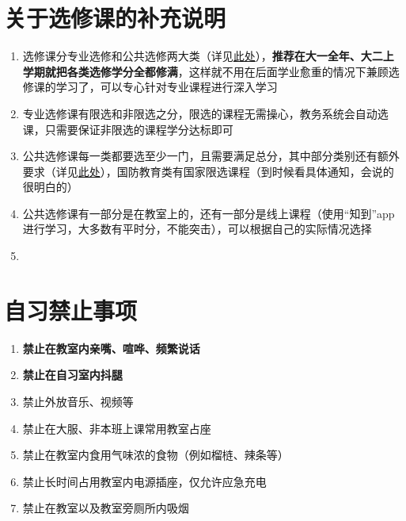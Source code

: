 \section[关于选修课的补充说明]{关于选修课的补充说明}
\begin{enumerate}
    \item 选修课分专业选修和公共选修两大类（详见\hyperref[score]{此处}），\textbf{推荐在大一全年、大二上学期就把各类选修学分全都修满}，这样就不用在后面学业愈重的情况下兼顾选修课的学习了，可以专心针对专业课程进行深入学习
    \item 专业选修课有限选和非限选之分，限选的课程无需操心，教务系统会自动选课，只需要保证非限选的课程学分达标即可
    \item 公共选修课每一类都要选至少一门，且需要满足总分，其中部分类别还有额外要求（详见\hyperref[score]{此处}），国防教育类有国家限选课程（到时候看具体通知，会说的很明白的）
    \item 公共选修课有一部分是在教室上的，还有一部分是线上课程（使用“知到”app进行学习，大多数有平时分，不能突击），可以根据自己的实际情况选择\footnotemark
    \item \textbf{}
\end{enumerate}

\section[自习禁止事项]{自习禁止事项}
\begin{enumerate}
    \item \textbf{禁止在教室内亲嘴、喧哗、频繁说话}
    \item \textbf{禁止在自习室内抖腿}
    \item 禁止外放音乐、视频等
    \item 禁止在大服、非本班上课常用教室占座
    \item 禁止在教室内食用气味浓的食物（例如榴梿、辣条等）
    \item 禁止长时间占用教室内电源插座，仅允许应急充电
    \item 禁止在教室以及教室旁厕所内吸烟
\end{enumerate}

